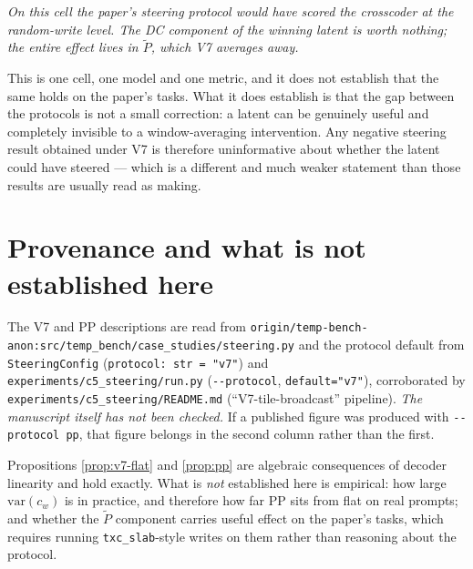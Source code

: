 \documentclass[11pt]{article}
\theoremstyle{definition}
\newcommand{\slab}{P}
\newcommand{\ac}{\widetilde{\slab}}
\begin{document}
\begin{center}
\emph{On this cell the paper's steering protocol would have scored the crosscoder at the
random-write level. The DC component of the winning latent is worth nothing; the entire effect
lives in $\ac$, which V7 averages away.}
\end{center}

This is one cell, one model and one metric, and it does not establish that the same holds on the
paper's tasks. What it does establish is that the gap between the protocols is not a small
correction: a latent can be genuinely useful and completely invisible to a window-averaging
intervention. Any negative steering result obtained under V7 is therefore uninformative about
whether the latent could have steered --- which is a different and much weaker statement than
those results are usually read as making.

\section*{Provenance and what is not established here}

The V7 and PP descriptions are read from
\verb|origin/temp-bench-anon:src/temp_bench/case_studies/steering.py| and the protocol default
from \verb|SteeringConfig| (\verb|protocol: str = "v7"|) and
\verb|experiments/c5_steering/run.py| (\verb|--protocol|, \verb|default="v7"|), corroborated by
\verb|experiments/c5_steering/README.md| (``V7-tile-broadcast'' pipeline). \emph{The manuscript
itself has not been checked.} If a published figure was produced with \verb|--protocol pp|, that
figure belongs in the second column rather than the first.

Propositions \ref{prop:v7-flat} and \ref{prop:pp} are algebraic consequences of decoder linearity
and hold exactly. What is \emph{not} established here is empirical: how large
$\mathrm{var}(c_w)$ is in practice, and therefore how far PP sits from flat on real prompts;
and whether the $\ac$ component carries useful effect on the paper's tasks, which requires
running \texttt{txc\_slab}-style writes on them rather than reasoning about the protocol.
\end{document}

